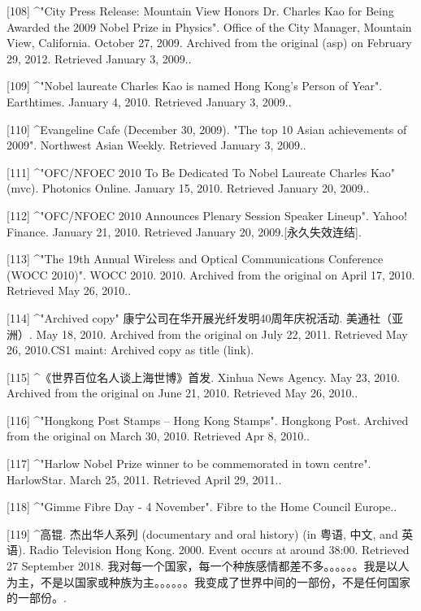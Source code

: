 [108]
^"City Press Release: Mountain View Honors Dr. Charles Kao for Being Awarded the 2009 Nobel Prize in Physics". Office of the City Manager, Mountain View, California. October 27, 2009. Archived from the original (asp) on February 29, 2012. Retrieved January 3, 2009..

[109]
^"Nobel laureate Charles Kao is named Hong Kong's Person of Year". Earthtimes. January 4, 2010. Retrieved January 3, 2009..

[110]
^Evangeline Cafe (December 30, 2009). "The top 10 Asian achievements of 2009". Northwest Asian Weekly. Retrieved January 3, 2009..

[111]
^"OFC/NFOEC 2010 To Be Dedicated To Nobel Laureate Charles Kao" (mvc). Photonics Online. January 15, 2010. Retrieved January 20, 2009..

[112]
^"OFC/NFOEC 2010 Announces Plenary Session Speaker Lineup". Yahoo! Finance. January 21, 2010. Retrieved January 20, 2009.[永久失效连结].

[113]
^"The 19th Annual Wireless and Optical Communications Conference (WOCC 2010)". WOCC 2010. 2010. Archived from the original on April 17, 2010. Retrieved May 26, 2010..

[114]
^"Archived copy" 康宁公司在华开展光纤发明40周年庆祝活动. 美通社（亚洲）. May 18, 2010. Archived from the original on July 22, 2011. Retrieved May 26, 2010.CS1 maint: Archived copy as title (link).

[115]
^《世界百位名人谈上海世博》首发. Xinhua News Agency. May 23, 2010. Archived from the original on June 21, 2010. Retrieved May 26, 2010..

[116]
^"Hongkong Post Stamps – Hong Kong Stamps". Hongkong Post. Archived from the original on March 30, 2010. Retrieved Apr 8, 2010..

[117]
^"Harlow Nobel Prize winner to be commemorated in town centre". HarlowStar. March 25, 2011. Retrieved April 29, 2011..

[118]
^"Gimme Fibre Day - 4 November". Fibre to the Home Council Europe..

[119]
^高锟. 杰出华人系列 (documentary and oral history) (in 粤语, 中文, and 英语). Radio Television Hong Kong. 2000. Event occurs at around 38:00. Retrieved 27 September 2018. 我对每一个国家，每一个种族感情都差不多。。。。。。我是以人为主，不是以国家或种族为主。。。。。。我变成了世界中间的一部份，不是任何国家的一部份。.

